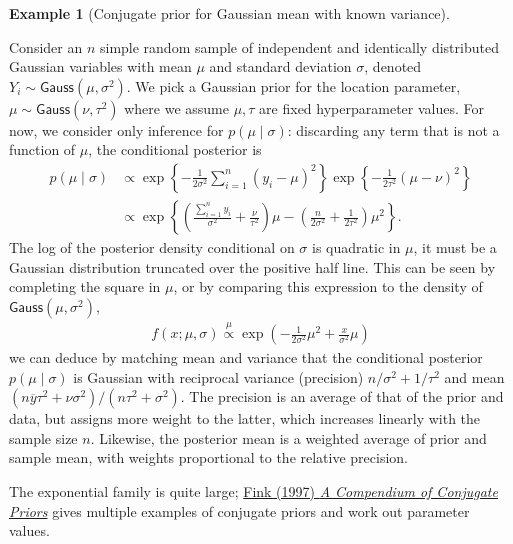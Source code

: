 \documentclass[
  11pt,
  letterpaper,
]{scrbook}
\theoremstyle{definition}
\theoremstyle{plain}
\theoremstyle{plain}
\theoremstyle{definition}
\newtheorem{example}{Example}[chapter]
\theoremstyle{definition}
\theoremstyle{remark}
\begin{document}
\begin{example}[Conjugate prior for Gaussian mean with known
variance]\protect\hypertarget{exm-conjugatepriors-normal}{}\label{exm-conjugatepriors-normal}

Consider an \(n\) simple random sample of independent and identically
distributed Gaussian variables with mean \(\mu\) and standard deviation
\(\sigma\), denoted \(Y_i \sim \mathsf{Gauss}(\mu, \sigma^2)\). We pick
a Gaussian prior for the location parameter,
\(\mu \sim \mathsf{Gauss}(\nu, \tau^2)\) where we assume \(\mu, \tau\)
are fixed hyperparameter values. For now, we consider only inference for
\(p(\mu \mid \sigma)\): discarding any term that is not a function of
\(\mu\), the conditional posterior is \begin{align*}
p(\mu \mid \sigma) &\propto \exp\left\{ -\frac{1}{2\sigma^2}\sum_{i=1}^n (y_{i}-\mu)^2\right\} \exp\left\{-\frac{1}{2\tau^2}(\mu - \nu)^2\right\}
\\&\propto \exp\left\{\left(\frac{\sum_{i=1}^n y_{i}}{\sigma^2} + \frac{\nu}{\tau^2}\right)\mu - \left( \frac{n}{2\sigma^2} +\frac{1}{2\tau^2}\right)\mu^2\right\}.
\end{align*} The log of the posterior density conditional on \(\sigma\)
is quadratic in \(\mu\), it must be a Gaussian distribution truncated
over the positive half line. This can be seen by completing the square
in \(\mu\), or by comparing this expression to the density of
\(\mathsf{Gauss}(\mu, \sigma^2)\), \begin{align*}
f(x; \mu, \sigma) \stackrel{\mu}{\propto} \exp\left(-\frac{1}{2 \sigma^2}\mu^2 + \frac{x}{\sigma^2}\mu\right)
\end{align*} we can deduce by matching mean and variance that the
conditional posterior \(p(\mu \mid \sigma)\) is Gaussian with reciprocal
variance (precision) \(n/\sigma^2 + 1/\tau^2\) and mean
\((n\overline{y}\tau^2 + \nu \sigma^2)/(n\tau^2 + \sigma^2)\). The
precision is an average of that of the prior and data, but assigns more
weight to the latter, which increases linearly with the sample size
\(n\). Likewise, the posterior mean is a weighted average of prior and
sample mean, with weights proportional to the relative precision.

\end{example}

The exponential family is quite large;
\href{https://citeseerx.ist.psu.edu/doc/10.1.1.157.5540}{Fink (1997)
\emph{A Compendium of Conjugate Priors}} gives multiple examples of
conjugate priors and work out parameter values.
\end{document}
